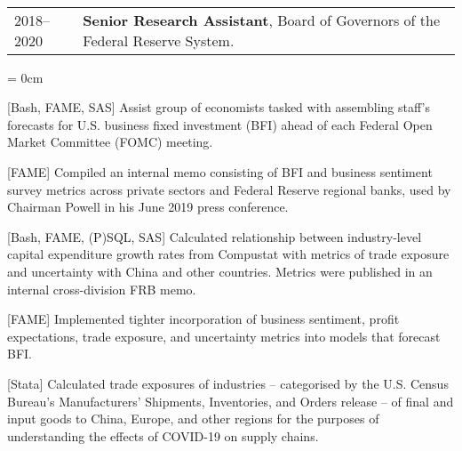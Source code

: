\documentclass[a4paper, 11pt]{article}
\begin{document}
      ~\begin{tabular}{ll}
        2018--2020 & \textbf{Senior Research Assistant}, Board of Governors of the Federal Reserve System.
      \end{tabular}
      \begin{compactitem}\parskip = 0cm
        \item {[Bash, FAME, SAS]} Assist group of economists tasked with assembling staff's forecasts for U.S. business fixed investment (BFI) ahead of each Federal Open Market Committee (FOMC) meeting.
        \item {[FAME]} Compiled an internal memo consisting of BFI and business sentiment survey metrics across private sectors and Federal Reserve regional banks, used by Chairman Powell in his June 2019 press conference.
        \item {[Bash, FAME, (P)SQL, SAS]} Calculated relationship between industry-level capital expenditure growth rates from Compustat with metrics of trade exposure and uncertainty with China and other countries. Metrics were published in an internal cross-division FRB memo.
        \item {[FAME]} Implemented tighter incorporation of business sentiment, profit expectations, trade exposure, and uncertainty metrics into models that forecast BFI.
        \item {[Stata]} Calculated trade exposures of industries -- categorised by the U.S. Census Bureau's Manufacturers' Shipments, Inventories, and Orders release -- of final and input goods to China, Europe, and other regions for the purposes of understanding the effects of COVID-19 on supply chains.
      \end{compactitem}
      
      \vspace*{1em}
      
\end{document}
